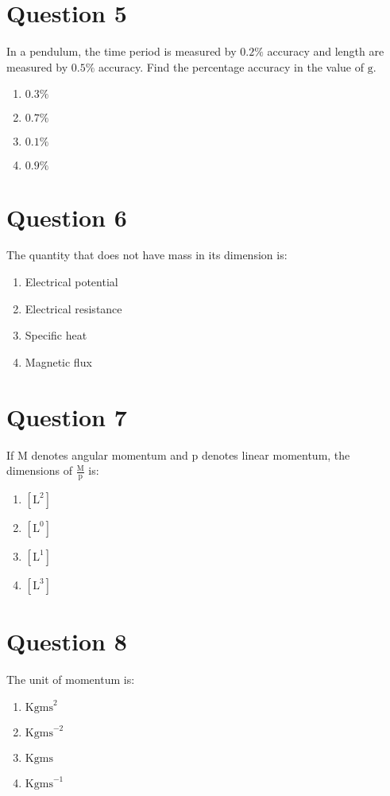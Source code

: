 \documentclass{article}
\begin{document}
\section*{Question 5}
In a pendulum, the time period is measured by \(0.2 \%\) accuracy and length are measured by \(0.5 \%\) accuracy. Find the percentage accuracy in the value of \(\mathrm{g}\).
\begin{enumerate}[label=(\alph*)]
\item \(0.3 \%\)
\item \(0.7 \%\)
\item \(0.1 \%\)
\item \(0.9 \%\)
\end{enumerate}
\newpage
\section*{Question 6}
The quantity that does not have mass in its dimension is:\newline
\begin{enumerate}[label=(\alph*)]
\item Electrical potential
\item Electrical resistance
\item Specific heat
\item Magnetic flux
\end{enumerate}
\newpage
\section*{Question 7}
If \(\mathrm{M}\) denotes angular momentum and \(\mathrm{p}\) denotes linear momentum, the dimensions of \(\frac{\mathrm M}{\mathrm p}\) is:
\begin{enumerate}[label=(\alph*)]
\item \([\mathrm L^2]\)
\item \([\mathrm L^0]\)
\item \([\mathrm L^1]\)
\item \([\mathrm L^3]\)
\end{enumerate}
\newpage
\section*{Question 8}
The unit of momentum is:
\begin{enumerate}[label=(\alph*)]
\item \(\mathrm{Kgms}^{2}\)
\item \(\mathrm{Kgms}^{-2}\)
\item \(\mathrm{Kgms}\)
\item \(\mathrm{Kgms}^{-1}\)
\end{enumerate}
\newpage
\end{document}
